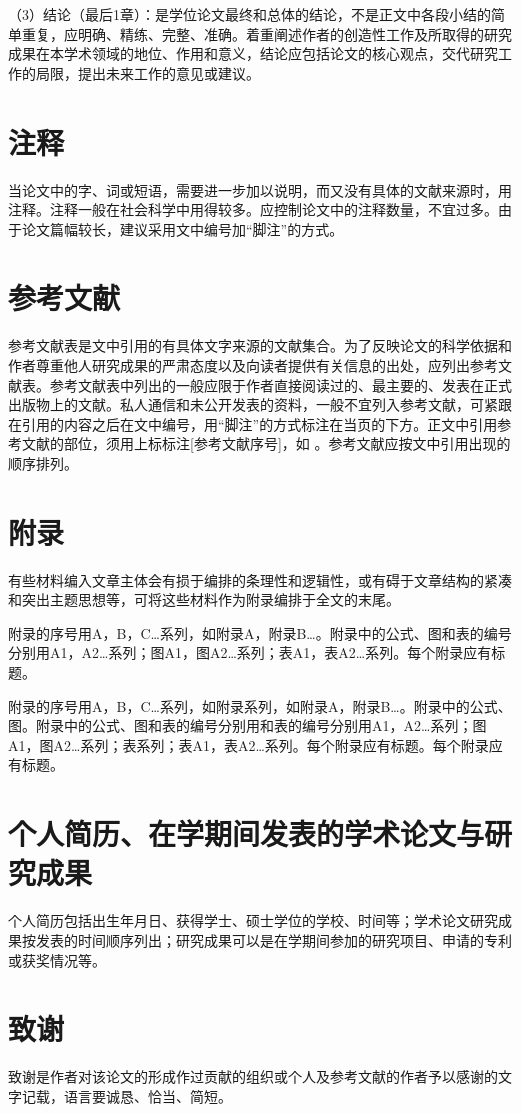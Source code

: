 （3）结论（最后1章）：是学位论文最终和总体的结论，不是正文中各段小结的简单重复，应明确、精练、完整、准确。着重阐述作者的创造性工作及所取得的研究成果在本学术领域的地位、作用和意义，结论应包括论文的核心观点，交代研究工作的局限，提出未来工作的意见或建议。


\section{注释}
当论文中的字、词或短语，需要进一步加以说明，而又没有具体的文献来源时，用注释。注释一般在社会科学中用得较多。应控制论文中的注释数量，不宜过多。由于论文篇幅较长，建议采用文中编号加“脚注”的方式。

\section{参考文献}
参考文献表是文中引用的有具体文字来源的文献集合。为了反映论文的科学依据和作者尊重他人研究成果的严肃态度以及向读者提供有关信息的出处，应列出参考文献表。参考文献表中列出的一般应限于作者直接阅读过的、最主要的、发表在正式出版物上的文献。私人通信和未公开发表的资料，一般不宜列入参考文献，可紧跟在引用的内容之后在文中编号，用“脚注”的方式标注在当页的下方。正文中引用参考文献的部位，须用上标标注[参考文献序号]，如 \cite{chen2001,nadkarni1992,hua1973,zhu1973,huo1981,timoshenko1959,zhang1991,dupont1974,ding2001,cairns1965,patent,standard,Karl2022}。参考文献应按文中引用出现的顺序排列。

\section{附录}
有些材料编入文章主体会有损于编排的条理性和逻辑性，或有碍于文章结构的紧凑和突出主题思想等，可将这些材料作为附录编排于全文的末尾。

附录的序号用A，B，C…系列，如附录A，附录B…。附录中的公式、图和表的编号分别用A1，A2…系列；图A1，图A2…系列；表A1，表A2…系列。每个附录应有标题。


附录的序号用A，B，C…系列，如附录系列，如附录A，附录B…。附录中的公式、图。附录中的公式、图和表的编号分别用和表的编号分别用A1，A2…系列；图A1，图A2…系列；表系列；表A1，表A2…系列。每个附录应有标题。每个附录应有标题。

\section{个人简历、在学期间发表的学术论文与研究成果}
个人简历包括出生年月日、获得学士、硕士学位的学校、时间等；学术论文研究成果按发表的时间顺序列出；研究成果可以是在学期间参加的研究项目、申请的专利或获奖情况等。

\section{致谢}
致谢是作者对该论文的形成作过贡献的组织或个人及参考文献的作者予以感谢的文字记载，语言要诚恳、恰当、简短。

